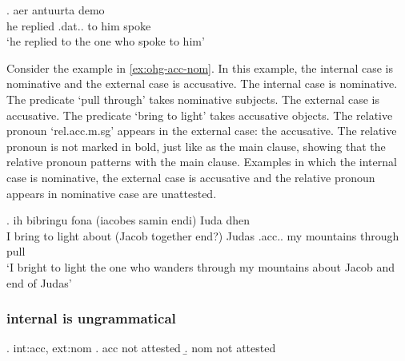 \exg. aer antuurta demo  \\
 he replied\scsub{[dat]} .\ac{dat}.. {to him} spoke\scsub{[nom]}\\
 `he replied to the one who spoke to him' \label{ex:ohg-dat-nom}



Consider the example in \ref{ex:ohg-acc-nom}. In this example, the internal case is nominative and the external case is accusative.
The internal case is nominative. The predicate  `pull through' takes nominative subjects.
The external case is accusative. The predicate  `bring to light' takes accusative objects.
The relative pronoun  `\ac{rel}.\ac{acc}.\ac{m}.\ac{sg}' appears in the external case: the accusative. The relative pronoun is not marked in bold, just like as the main clause, showing that the relative pronoun patterns with the main clause.
Examples in which the internal case is nominative, the external case is accusative and the relative pronoun appears in nominative case are unattested.

\exg. ih bibringu fona (iacobes samin endi) Iuda dhen   \\
 I {bring to light}\scsub{[acc]} about (Jacob together end?) Judas .\ac{acc}.. my mountains {through pull}\scsub{[nom]}\\
 `I bright to light the one who wanders through my mountains about Jacob and end of Judas' \label{ex:ohg-acc-nom}










  \subsubsection{internal is ungrammatical}

  \ex. \ac{int}:\ac{acc}, \ac{ext}:\ac{nom}
  \a. \ac{acc} not attested
  \b. \ac{nom} not attested


